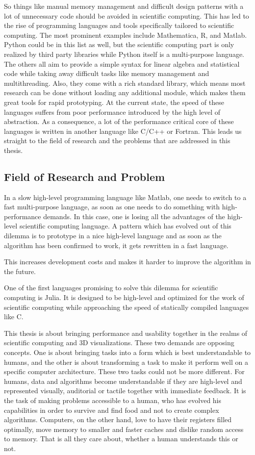 So things like manual memory management and difficult design patterns with a lot of unnecessary code should be avoided in scientific computing.
This has led to the rise of programming languages and tools specifically tailored to scientific computing.
The most prominent examples include Mathematica, R, and Matlab. 
Python could be in this list as well, but the scientific computing part is only realized by third party libraries while Python itself is a multi-purpose language.
The others all aim to provide a simple syntax for linear algebra and statistical code while taking away difficult tasks like memory management and multithreading. 
Also, they come with a rich standard library, which means most research can be done without loading any additional module, which makes them great tools for rapid prototyping.
At the current state, the speed of these languages suffers from poor performance introduced by the high level of abstraction.
As a consequence, a lot of the performance critical core of these languages is written in another language like C/C++ or Fortran. 
This leads us straight to the field of research and the problems that are addressed in this thesis.


\subsection{Field of Research and Problem}

In a slow high-level programming language like Matlab, one needs to switch to a fast multi-purpose language, as soon as one needs to do something with high-performance demands.
In this case, one is losing all the advantages of the high-level scientific computing language.
A pattern which has evolved out of this dilemma is to prototype in a nice high-level language and as soon as the algorithm has been confirmed to work, it gets rewritten in a fast language.

This increases development costs and makes it harder to improve the algorithm in the future.

One of the first languages promising to solve this dilemma for scientific computing is Julia. 
It is designed to be high-level and optimized for the work of scientific computing while approaching the speed of statically compiled languages like C.

This thesis is about bringing performance and usability together in the realms of scientific computing and 3D visualizations.
These two demands are opposing concepts. 
One is about bringing tasks into a form which is best understandable to humans, and the other is about transforming a task to make it perform well on a specific computer architecture.
These two tasks could not be more different. 
For humans, data and algorithms become understandable if they are high-level and represented visually, auditorial or tactile together with immediate feedback. 
It is the task of making problems accessible to a human, who has evolved his capabilities in order to survive and find food and not to create complex algorithms.
Computers, on the other hand, love to have their registers filled optimally, move memory to smaller and faster caches and dislike random access to memory. That is all they care about, whether a human understands this or not.

